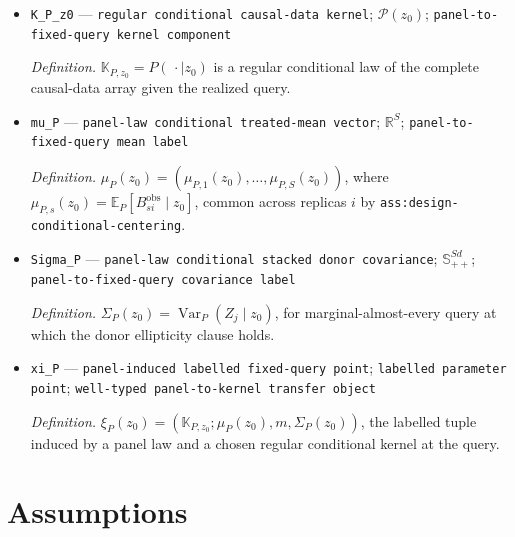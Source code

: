 \documentclass{article}
\begin{document}
\begin{itemize}
  \par\smallskip\noindent\emph{Definition.} For \(\xi=(\mathbb K_\xi;\mu,m,\Sigma)\), \(\theta_{\mathrm{ker}}(\xi;z_0)=\sum_{s=1}^{S}\pi_s\{\mu_s-m_s(z_{0s})\}\); positivity and continuity make its value unique from \(\mathbb K_\xi\vert_{\mathcal O}\).
  \item \texttt{K\_\allowbreak{}P\_\allowbreak{}z0} --- \texttt{regular conditional causal-\allowbreak{}data kernel}; \(\mathcal P(z_0)\); \texttt{panel-\allowbreak{}to-\allowbreak{}fixed-\allowbreak{}query kernel component}
  \par\smallskip\noindent\emph{Definition.} \(\mathbb K_{P,z_0}=P(\,\cdot\mid z_0)\) is a regular conditional law of the complete causal-data array given the realized query.
  \item \texttt{mu\_\allowbreak{}P} --- \texttt{panel-\allowbreak{}law conditional treated-\allowbreak{}mean vector}; \(\mathbb R^S\); \texttt{panel-\allowbreak{}to-\allowbreak{}fixed-\allowbreak{}query mean label}
  \par\smallskip\noindent\emph{Definition.} \(\mu_P(z_0)=(\mu_{P,1}(z_0),\ldots,\mu_{P,S}(z_0))\), where \(\mu_{P,s}(z_0)=\mathbb E_P[B_{si}^{\mathrm{obs}}\mid z_0]\), common across replicas \(i\) by \texttt{ass:design-conditional-centering}.
  \item \texttt{Sigma\_\allowbreak{}P} --- \texttt{panel-\allowbreak{}law conditional stacked donor covariance}; \(\mathbb S_{++}^{Sd}\); \texttt{panel-\allowbreak{}to-\allowbreak{}fixed-\allowbreak{}query covariance label}
  \par\smallskip\noindent\emph{Definition.} \(\Sigma_P(z_0)=\operatorname{Var}_P(Z_j\mid z_0)\), for marginal-almost-every query at which the donor ellipticity clause holds.
  \item \texttt{xi\_\allowbreak{}P} --- \texttt{panel-\allowbreak{}induced labelled fixed-\allowbreak{}query point}; \texttt{labelled parameter point}; \texttt{well-\allowbreak{}typed panel-\allowbreak{}to-\allowbreak{}kernel transfer object}
  \par\smallskip\noindent\emph{Definition.} \(\xi_P(z_0)=(\mathbb K_{P,z_0};\mu_P(z_0),m,\Sigma_P(z_0))\), the labelled tuple induced by a panel law and a chosen regular conditional kernel at the query.
\end{itemize}

\section{Assumptions}
\end{document}
